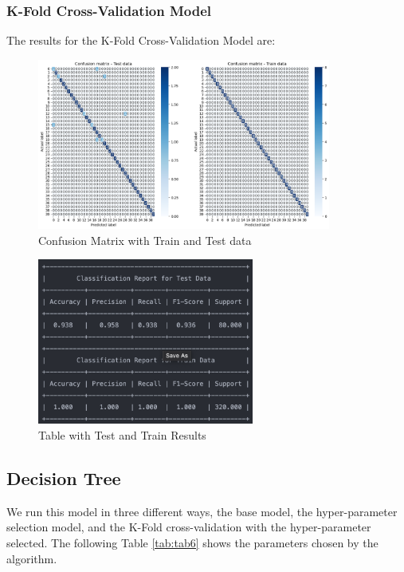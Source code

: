 \documentclass[conference]{IEEEtran}
\begin{document}
\subsubsection{K-Fold Cross-Validation Model}

The results for the K-Fold Cross-Validation Model are:

\begin{figure}[!h!]
    \includegraphics[width=3.8in]{k-NN/3.png}%
    \caption{Confusion Matrix with Train and Test data}%
    \label{fig:conf_gnb_3}%
\end{figure}

\begin{figure}[!h!]
    \includegraphics[width=2.8in]{k-NN/r_3.png}%
    \caption{Table with Test and Train Results}%
    \label{fig:conf_gnb_r_3}%
\end{figure}


\subsection{Decision Tree}


We run this model in three different ways, the base model, the hyper-parameter selection model, and the K-Fold cross-validation with the hyper-parameter selected. The following Table \ref{tab:tab6} shows the parameters chosen by the algorithm.
\end{document}
